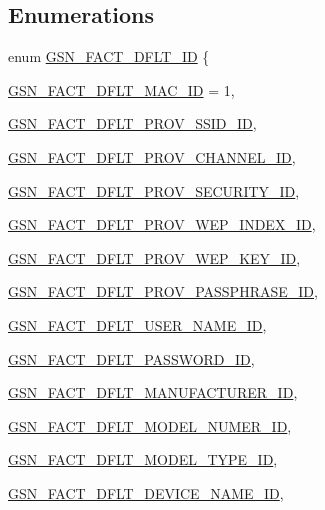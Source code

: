\subsection*{Enumerations}
\begin{DoxyCompactItemize}
\item 
enum \hyperlink{a00499_a36c3dc2e14b83eabfa65c84a1b36753f}{GSN\_\-FACT\_\-DFLT\_\-ID} \{ \par
\hyperlink{a00499_a36c3dc2e14b83eabfa65c84a1b36753fa4fa45553ac8e592aed31a57935bdf403}{GSN\_\-FACT\_\-DFLT\_\-MAC\_\-ID} =  1, 
\par
\hyperlink{a00499_a36c3dc2e14b83eabfa65c84a1b36753faea21660eb7f754a281f15305064fba38}{GSN\_\-FACT\_\-DFLT\_\-PROV\_\-SSID\_\-ID}, 
\par
\hyperlink{a00499_a36c3dc2e14b83eabfa65c84a1b36753fa5b7399c5c74e9c9f75ceddd4dec901f8}{GSN\_\-FACT\_\-DFLT\_\-PROV\_\-CHANNEL\_\-ID}, 
\par
\hyperlink{a00499_a36c3dc2e14b83eabfa65c84a1b36753fa5e5391efc2dd9ec5bdcedf404535006b}{GSN\_\-FACT\_\-DFLT\_\-PROV\_\-SECURITY\_\-ID}, 
\par
\hyperlink{a00499_a36c3dc2e14b83eabfa65c84a1b36753fa7f72e7298c066a460877ccf553317746}{GSN\_\-FACT\_\-DFLT\_\-PROV\_\-WEP\_\-INDEX\_\-ID}, 
\par
\hyperlink{a00499_a36c3dc2e14b83eabfa65c84a1b36753fac3e084a41353ca6675086efc207c7595}{GSN\_\-FACT\_\-DFLT\_\-PROV\_\-WEP\_\-KEY\_\-ID}, 
\par
\hyperlink{a00499_a36c3dc2e14b83eabfa65c84a1b36753fa93cd109cc2f249b01771c57ed361fda5}{GSN\_\-FACT\_\-DFLT\_\-PROV\_\-PASSPHRASE\_\-ID}, 
\par
\hyperlink{a00499_a36c3dc2e14b83eabfa65c84a1b36753fa235ec2dcb5895317c764b6f93c1dec8a}{GSN\_\-FACT\_\-DFLT\_\-USER\_\-NAME\_\-ID}, 
\par
\hyperlink{a00499_a36c3dc2e14b83eabfa65c84a1b36753fad56de5ed3b7f80af8bd1d58fff0795da}{GSN\_\-FACT\_\-DFLT\_\-PASSWORD\_\-ID}, 
\par
\hyperlink{a00499_a36c3dc2e14b83eabfa65c84a1b36753fa616a3d4fd8841cc5c15b8a49ed7f2f4b}{GSN\_\-FACT\_\-DFLT\_\-MANUFACTURER\_\-ID}, 
\par
\hyperlink{a00499_a36c3dc2e14b83eabfa65c84a1b36753fa397a9330929e565735ccd21d9f3bba85}{GSN\_\-FACT\_\-DFLT\_\-MODEL\_\-NUMER\_\-ID}, 
\par
\hyperlink{a00499_a36c3dc2e14b83eabfa65c84a1b36753fab7af9cd9f7f429796a2a217fe9691118}{GSN\_\-FACT\_\-DFLT\_\-MODEL\_\-TYPE\_\-ID}, 
\par
\hyperlink{a00499_a36c3dc2e14b83eabfa65c84a1b36753fac0564a360354467267ae14e169b5b618}{GSN\_\-FACT\_\-DFLT\_\-DEVICE\_\-NAME\_\-ID}, 

\end{DoxyCompactItemize}

